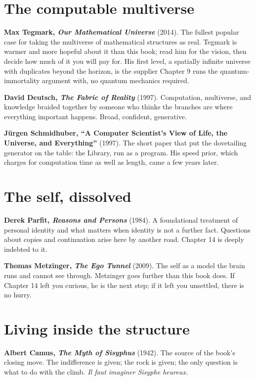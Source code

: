 \section*{The computable multiverse}

\textbf{Max Tegmark, \textit{Our Mathematical Universe}} (2014). The fullest popular case for taking the multiverse of mathematical structures as real. Tegmark is warmer and more hopeful about it than this book; read him for the vision, then decide how much of it you will pay for. His first level, a spatially infinite universe with duplicates beyond the horizon, is the supplier Chapter 9 runs the quantum-immortality argument with, no quantum mechanics required.

\textbf{David Deutsch, \textit{The Fabric of Reality}} (1997). Computation, multiverse, and knowledge braided together by someone who thinks the branches are where everything important happens. Broad, confident, generative.

\textbf{Jürgen Schmidhuber, ``A Computer Scientist's View of Life, the Universe, and Everything''} (1997). The short paper that put the dovetailing generator on the table: the Library, run as a program. His speed prior, which charges for computation time as well as length, came a few years later.

\section*{The self, dissolved}

\textbf{Derek Parfit, \textit{Reasons and Persons}} (1984). A foundational treatment of personal identity and what matters when identity is not a further fact. Questions about copies and continuation arise here by another road. Chapter 14 is deeply indebted to it.

\textbf{Thomas Metzinger, \textit{The Ego Tunnel}} (2009). The self as a model the brain runs and cannot see through. Metzinger goes further than this book does. If Chapter 14 left you curious, he is the next step; if it left you unsettled, there is no hurry.

\section*{Living inside the structure}

\textbf{Albert Camus, \textit{The Myth of Sisyphus}} (1942). The source of the book's closing move. The indifference is given; the rock is given; the only question is what to do with the climb. \textit{Il faut imaginer Sisyphe heureux.}

